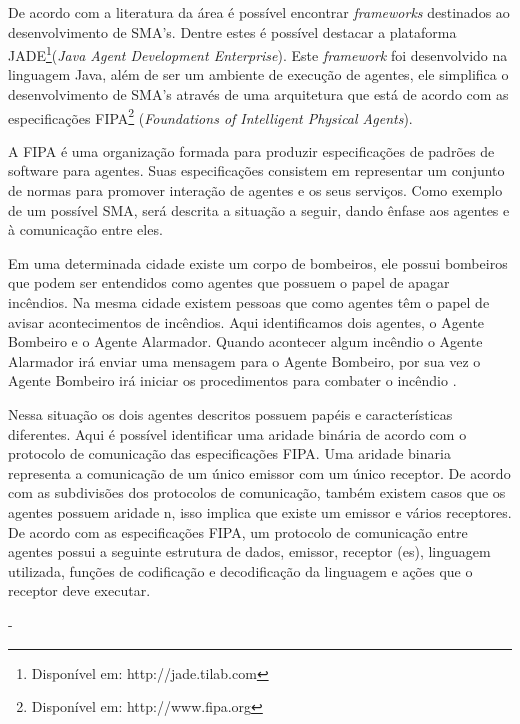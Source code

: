 De acordo com a literatura da área é possível encontrar \textit{frameworks} destinados ao desenvolvimento de SMA’s. Dentre estes é possível destacar a plataforma JADE\footnote{Disponível em: http://jade.tilab.com}(\textit{Java Agent Development Enterprise}). Este \textit{framework} foi desenvolvido na linguagem Java, além de ser um ambiente de execução de agentes, ele simplifica o desenvolvimento de SMA’s através de uma arquitetura que está de acordo com as especificações FIPA\footnote{Disponível em: http://www.fipa.org} (\textit{Foundations of Intelligent Physical Agents}).

A FIPA é uma organização formada para produzir especificações de padrões de software para agentes. Suas especificações consistem em representar um conjunto de normas para promover interação de agentes e os seus serviços. Como exemplo de um possível SMA, será descrita a situação a seguir, dando ênfase aos agentes e à comunicação entre eles.

Em uma determinada cidade existe um corpo de bombeiros, ele possui bombeiros que podem ser entendidos como agentes que possuem o papel de apagar incêndios. Na mesma cidade existem pessoas que como agentes têm o papel de avisar acontecimentos de incêndios. Aqui identificamos dois agentes, o Agente Bombeiro e o Agente Alarmador. Quando acontecer algum incêndio o Agente Alarmador irá enviar uma mensagem para o Agente Bombeiro, por sua vez o Agente Bombeiro irá iniciar os procedimentos para combater o incêndio \cite{batista2008desenvolvendo}.

Nessa situação os dois agentes descritos possuem papéis e características diferentes. Aqui é possível identificar uma aridade binária de acordo com o protocolo de comunicação das especificações FIPA. Uma aridade binaria representa a comunicação de um único emissor com um único receptor. De acordo com as subdivisões dos protocolos de comunicação, também existem casos que os agentes possuem aridade n, isso implica que existe um emissor e vários receptores. De acordo com as especificações FIPA, um protocolo de comunicação entre agentes possui a seguinte estrutura de dados, emissor, receptor (es), linguagem utilizada, funções de codificação e decodificação da linguagem e ações que o receptor deve executar.

-